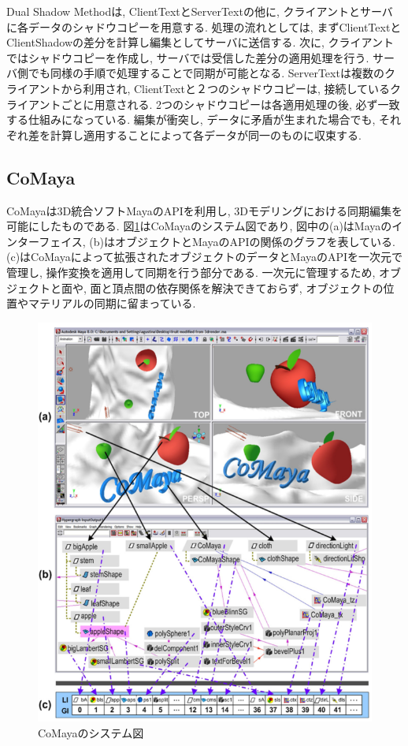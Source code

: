 Dual Shadow Methodは, ClientTextとServerTextの他に, クライアントとサーバに各データのシャドウコピーを用意する. 処理の流れとしては, まずClientTextとClientShadowの差分を計算し編集としてサーバに送信する. 次に, クライアントではシャドウコピーを作成し, サーバでは受信した差分の適用処理を行う. サーバ側でも同様の手順で処理することで同期が可能となる. ServerTextは複数のクライアントから利用され, ClientTextと２つのシャドウコピーは, 接続しているクライアントごとに用意される. 2つのシャドウコピーは各適用処理の後, 必ず一致する仕組みになっている. 編集が衝突し, データに矛盾が生まれた場合でも, それぞれ差を計算し適用することによって各データが同一のものに収束する.
%
\subsection{CoMaya}
CoMayaは3D統合ソフトMayaのAPIを利用し, 3Dモデリングにおける同期編集を可能にしたものである.
図\ref{comayapng}はCoMayaのシステム図であり, 図中の(a)はMayaのインターフェイス, (b)はオブジェクトとMayaのAPIの関係のグラフを表している. (c)はCoMayaによって拡張されたオブジェクトのデータとMayaのAPIを一次元で管理し, 操作変換を適用して同期を行う部分である.
一次元に管理するため, オブジェクトと面や, 面と頂点間の依存関係を解決できておらず, オブジェクトの位置やマテリアルの同期に留まっている.
\begin{figure}[]
  \begin{center}
    \includegraphics[scale=0.6]{images/comaya}
    \caption{CoMayaのシステム図\cite{COMAYA}}
    \label{comayapng}
  \end{center}
\end{figure}
%
